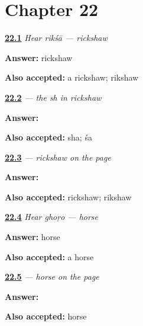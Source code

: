 \section*{Chapter 22}

\noindent\begin{minipage}[t]{\linewidth}
\raggedright
\hyperlink{review-MW-C17-hear-riksha-meaning}{\textbf{22.1}} \emph{Hear \emph{rikśā} — rickshaw}\par
\small \textbf{Answer:} rickshaw\par
\footnotesize \textbf{Also accepted:} a rickshaw; rikshaw
\end{minipage}\par\medskip

\noindent\begin{minipage}[t]{\linewidth}
\raggedright
\hyperlink{review-MW-W17-sha-write}{\textbf{22.2}} \emph{ — the \emph{sh} in rickshaw}\par
\small \textbf{Answer:} \par
\footnotesize \textbf{Also accepted:}  sha;  śa
\end{minipage}\par\medskip

\noindent\begin{minipage}[t]{\linewidth}
\raggedright
\hyperlink{review-MW-C17-riksha-dictation}{\textbf{22.3}} \emph{ — rickshaw on the page}\par
\small \textbf{Answer:} \par
\footnotesize \textbf{Also accepted:}  rickshaw;  rikshaw
\end{minipage}\par\medskip

\noindent\begin{minipage}[t]{\linewidth}
\raggedright
\hyperlink{review-MW-C17-hear-ghodo-meaning}{\textbf{22.4}} \emph{Hear \emph{ghoṛo} — horse}\par
\small \textbf{Answer:} horse\par
\footnotesize \textbf{Also accepted:} a horse
\end{minipage}\par\medskip

\noindent\begin{minipage}[t]{\linewidth}
\raggedright
\hyperlink{review-MW-C17-ghodo-dictation}{\textbf{22.5}} \emph{ — horse on the page}\par
\small \textbf{Answer:} \par
\footnotesize \textbf{Also accepted:}  horse
\end{minipage}\par\medskip

